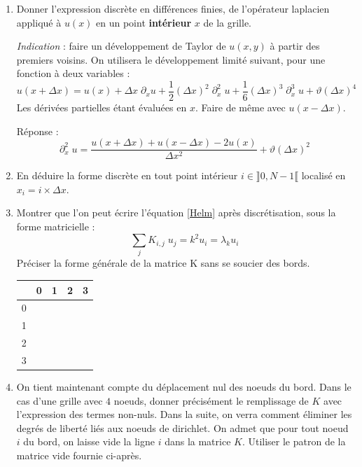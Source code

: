 \documentclass[a4paper, 12pt]{article}
\begin{document}
\begin{enumerate} 
\item Donner l'expression discrète en différences finies, de l'opérateur laplacien appliqué à $u(x)$ 
 en un point {\bf intérieur} $x$ de la grille. 

 {\it Indication} : faire un développement de Taylor de $u(x, y)$ à partir des premiers voisins.
On utilisera le développement limité suivant, pour une fonction à deux variables :
  \begin{equation}
 u(x+\Delta x) = u(x) + \Delta x\; \partial_x u + \frac{1}{2}  (\Delta x)^2\;  \partial^2_x  \; u+
\frac{1}{6}  (\Delta x)^3\;  \partial^3_x  \; u + \vartheta(\Delta x)^4
\end{equation}
Les dérivées partielles étant évaluées en $x$. 
Faire de même avec $u(x-\Delta x)$.

Réponse : $$\partial^2_x  \; u = \frac{u(x+\Delta x)+u(x-\Delta x)-2u(x)}{\Delta x^2}  + \vartheta(\Delta x)^2$$

\item En déduire la forme discrète en tout point intérieur $i \in \rrbracket 0, N-1 \llbracket $ localisé en $x_i = i \times \Delta x$.

\item Montrer que l'on peut écrire l'équation  \eqref{Helm}  après discrétisation, sous la forme matricielle :
\begin{equation}
\sum_j K_{i, j} \; u_j = k^2 u_i = \lambda_k u_i
\label{HelmDis}
\end{equation}
Préciser la forme générale de la matrice K sans se soucier des bords.
\begin{center}
   \begin{tabular}{| c | c | c | c | c |}
     \hline
     & 0 & 1 & 2 & 3 \\ \hline
     0 &  &   &   &   \\ \hline
     1 &  &   &   &   \\ \hline
     2 &  &   &   &   \\ \hline
     3 &  &   &   &   \\ \hline 
     \hline
   \end{tabular}
 \end{center}
 
\item On tient maintenant compte du déplacement nul des noeuds du bord.
Dans le cas d'une grille avec $4$ noeuds, donner
précisément le remplissage de $K$ avec l'expression des termes non-nuls. 
Dans la suite, on verra comment éliminer les degrés de liberté liés aux noeuds de dirichlet.
On admet que pour tout noeud ${i}$ du bord, on laisse vide la ligne  ${i}$ dans la matrice $K$.
Utiliser le patron de la matrice vide fournie ci-après.


\end{enumerate}
\end{document}
